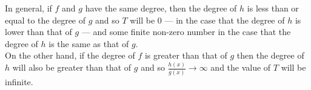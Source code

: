 \documentclass[../MathsNotesBase.tex]{subfiles}
\begin{document}
{		In general, if $f$ and $g$ have the same degree, then the degree of $h$ is less than or equal to the degree of $g$ and so $T$ will be 0 --- in the case that the degree of $h$ is lower than that of $g$ --- and some finite non-zero number in the case that the degree of $h$ is the same as that of $g$.\\
		
		On the other hand, if the degree of $f$ is greater than that of $g$ then the degree of $h$ will also be greater than that of $g$ and so ${ \frac{h(x)}{g(x)} \to \infty }$ and the value of $T$ will be infinite.
	}
	
\end{document}
